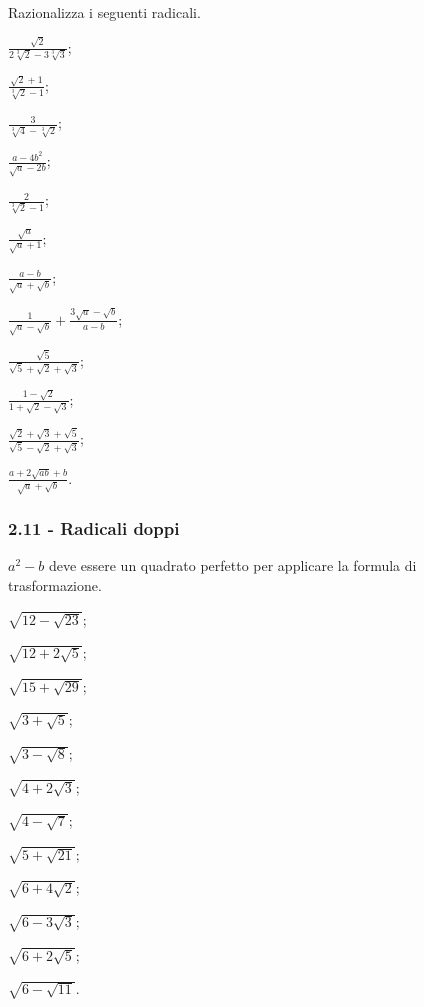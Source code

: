 \begin{esercizio}[\Ast]
 \label{ese:2.76}
Razionalizza i seguenti radicali.
 \begin{multicols}{3}
 \begin{enumeratea}
 \item $\frac{\sqrt 2}{2\sqrt[3]2-3\sqrt[3]3}$;
 \item $\frac{\sqrt 2+1}{\sqrt[3]2-1}$;
 \item $\frac 3{\sqrt[3]4-\sqrt[3]2}$;
 \item $\frac{a-4b^2}{\sqrt a-2b}$;
 \item $\frac 2{\sqrt[3]2-1}$;
 \item $\frac{\sqrt a}{\sqrt a+1}$;
 \item $\frac{a-b}{\sqrt a+\sqrt b}$;
 \item $\frac 1{\sqrt a-\sqrt b}+\frac{3\sqrt a-\sqrt b}{a-b}$;
 \item $\frac{\sqrt 5}{\sqrt 5+\sqrt 2+\sqrt 3}$;
 \item $\frac{1-\sqrt 2}{1+\sqrt 2-\sqrt 3}$;
 \item $\frac{\sqrt 2+\sqrt 3+\sqrt 5}{\sqrt 5-\sqrt 2+\sqrt 3}$;
 \item $\frac{a+2\sqrt{\mathit{ab}}+b}{\sqrt a+\sqrt b}$.
 \end{enumeratea}
 \end{multicols}
\end{esercizio}

\subsubsection*{2.11 - Radicali doppi}

\begin{esercizio}[\Ast]
 \label{ese:2.77}
$a^2-b$ deve essere un quadrato perfetto per applicare la formula di trasformazione.
 \begin{multicols}{4}
 \begin{enumeratea}
 \item $\sqrt{12-\sqrt{23}}$;
 \item $\sqrt{12+2\sqrt 5}$;
 \item $\sqrt{15+\sqrt{29}}$;
 \item $\sqrt{3+\sqrt 5}$;
 \item $\sqrt{3-\sqrt 8}$;
 \item $\sqrt{4+2\sqrt 3}$;
 \item $\sqrt{4-\sqrt 7}$;
 \item $\sqrt{5+\sqrt{21}}$;
 \item $\sqrt{6+4\sqrt 2}$;
 \item $\sqrt{6-3\sqrt 3}$;
 \item $\sqrt{6+2\sqrt 5}$;
 \item $\sqrt{6-\sqrt{11}}$.
 \end{enumeratea}
 \end{multicols}
\end{esercizio}

